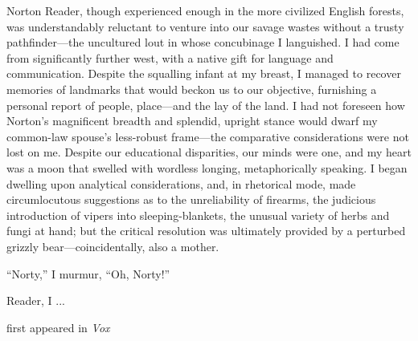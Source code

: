 Norton Reader, though experienced enough in the more civilized English
forests, was understandably reluctant to venture into our savage wastes
without a trusty pathfinder---the uncultured lout in whose concubinage I
languished. I had come from significantly further west, with a native
gift for language and communication. Despite the squalling infant at my
breast, I managed to recover memories of landmarks that would beckon us
to our objective, furnishing a personal report of people, place---and
the lay of the land. I had not foreseen how Norton's magnificent breadth
and splendid, upright stance would dwarf my common-law spouse's
less-robust frame---the comparative considerations were not lost on me.
Despite our educational disparities, our minds were one, and my heart
was a moon that swelled with wordless longing, metaphorically speaking.
I began dwelling upon analytical considerations, and, in rhetorical
mode, made circumlocutous suggestions as to the unreliability of
firearms, the judicious introduction of vipers into sleeping-blankets,
the unusual variety of herbs and fungi at hand; but the critical
resolution was ultimately provided by a perturbed grizzly
bear---coincidentally, also a mother.

``Norty,'' I murmur, ``Oh, Norty!''

Reader, I ...

first appeared in \emph{Vox}

